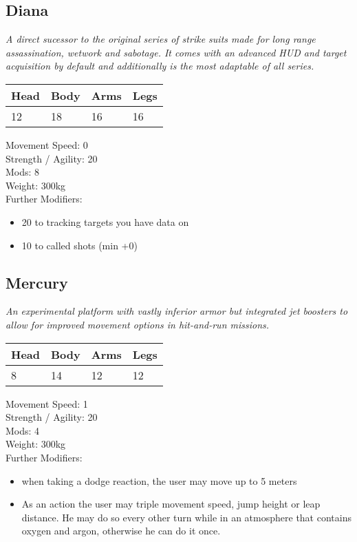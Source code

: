 \documentclass[12pt,a4paper,openany]{book}
\begin{document}
	\subsection{Diana}
	\textit{A direct sucessor to the original series of strike suits made for long range assassination, wetwork and sabotage. It comes with an advanced HUD and target acquisition by default and additionally is the most adaptable of all series.}\par
	\begin{tabular}{|l|l|l|l|}
		\hline
		Head & Body & Arms & Legs\\
		\hline
		12 & 18 & 16 & 16\\
		\hline
	\end{tabular}
	\par
	Movement Speed: 0\\
	Strength / Agility: 20\\
	Mods: 8\\
	Weight: 300kg\\
	Further Modifiers:
	\vspace{-8mm}
	\begin{itemize}
		\setlength\itemsep{-8mm}
		\item 20 to tracking targets you have data on
		\item 10 to called shots (min +0)
	\end{itemize}
	\par
	\subsection{Mercury}
	\textit{An experimental platform with vastly inferior armor but integrated jet boosters to allow for improved movement options in hit-and-run missions.}\par
	\begin{tabular}{|l|l|l|l|}
		\hline
		Head & Body & Arms & Legs\\
		\hline
		8 & 14 & 12 & 12\\
		\hline
	\end{tabular}
	\par
	Movement Speed: 1\\
	Strength / Agility: 20\\
	Mods: 4\\
	Weight: 300kg\\
	Further Modifiers:
	\vspace{-8mm}
	\begin{itemize}
		\setlength\itemsep{-8mm}
		\item when taking a dodge reaction, the user may move up to 5 meters
		\item As an action the user may triple movement speed, jump height or leap distance. He may do so every other turn while in an atmosphere that contains oxygen and argon, otherwise he can do it once.
	\end{itemize}
	\par
\end{document}
